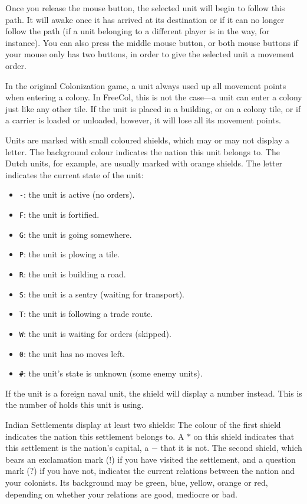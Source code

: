 \documentclass[12pt]{book}
\begin{document}
Once you release the mouse button, the selected unit will begin to
follow this path. It will awake once it has arrived at its destination
or if it can no longer follow the path (if a unit belonging to a
different player is in the way, for instance). You can also press the
middle mouse button, or both mouse buttons if your mouse only has two
buttons, in order to give the selected unit a movement order.

In the original Colonization game, a unit always used up all movement
points when entering a colony. In FreeCol, this is not the case---a
unit can enter a colony just like any other tile. If the unit is
placed in a building, or on a colony tile, or if a carrier is loaded
or unloaded, however, it will lose all its movement points.

Units are marked with small coloured shields, which may or may not
display a letter. The background colour indicates the nation this unit
belongs to. The Dutch units, for example, are usually marked with
orange shields. The letter indicates the current state of the unit:

\pagebreak[2]
\begin{itemize}
\item\verb$-$: the unit is active (no orders).
\item\verb$F$: the unit is fortified.
\item\verb$G$: the unit is going somewhere.
\item\verb$P$: the unit is plowing a tile.
\item\verb$R$: the unit is building a road.
\item\verb$S$: the unit is a sentry (waiting for transport).
\item\verb$T$: the unit is following a trade route.
\item\verb$W$: the unit is waiting for orders (skipped).
\item\verb$0$: the unit has no moves left.
\item\verb$#$: the unit's state is unknown (some enemy units).
\end{itemize}

If the unit is a foreign naval unit, the shield will display a number
instead. This is the number of holds this unit is using.

Indian Settlements display at least two shields: The colour of the
first shield indicates the nation this settlement belongs to. A $*$ on
this shield indicates that this settlement is the nation's capital, a
$-$ that it is not. The second shield, which bears an exclamation mark
($!$) if you have visited the settlement, and a question mark ($?$) if
you have not, indicates the current relations between the nation and
your colonists. Its background may be green, blue, yellow, orange or
red, depending on whether your relations are good, mediocre or bad.
\end{document}
